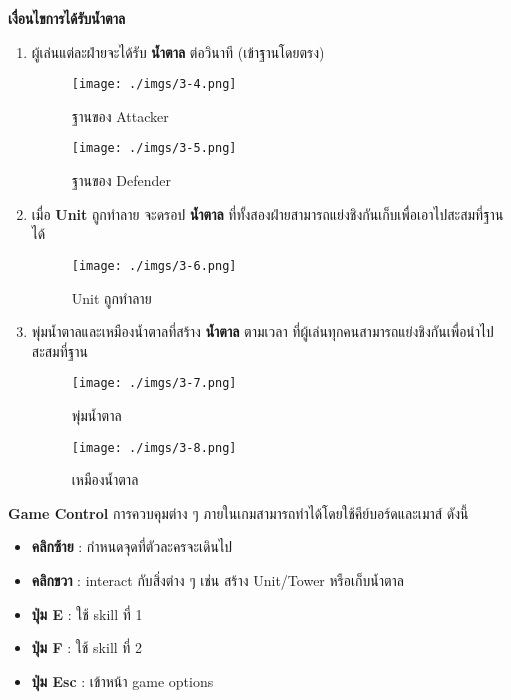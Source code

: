 \documentclass[12pt,oneside,openright,a4paper]{cpe-thai-project}
\begin{document}
\textbf{เงื่อนไขการได้รับน้ำตาล}

\begin{enumerate}
  \item ผู้เล่นแต่ละฝ่ายจะได้รับ \textbf{น้ำตาล} ต่อวินาที (เข้าฐานโดยตรง)
  \begin{figure}[H]\centering
    \begin{minipage}{.3\textwidth}
      \centering
      \texttt{[image: ./imgs/3-4.png]}
      \caption{ฐานของ Attacker}\label{fig:3-4}
    \end{minipage}
    \begin{minipage}{.3\textwidth}
      \centering
      \texttt{[image: ./imgs/3-5.png]}
      \caption{ฐานของ Defender}\label{fig:3-5}
    \end{minipage}
  \end{figure}

  \item เมื่อ \textbf{Unit} ถูกทำลาย จะดรอป \textbf{น้ำตาล} 
  ที่ทั้งสองฝ่ายสามารถแย่งชิงกันเก็บเพื่อเอาไปสะสมที่ฐานได้
  \begin{figure}[H]\centering
    \texttt{[image: ./imgs/3-6.png]}
    \caption{Unit ถูกทำลาย}\label{fig:3-6}
  \end{figure}

  \item พุ่มน้ำตาลและเหมืองน้ำตาลที่สร้าง \textbf{น้ำตาล} ตามเวลา 
  ที่ผู้เล่นทุกคนสามารถแย่งชิงกันเพื่อนำไปสะสมที่ฐาน
  \begin{figure}[H]\centering
    \begin{minipage}{.3\textwidth}
      \centering
      \texttt{[image: ./imgs/3-7.png]}
      \caption{พุ่มน้ำตาล}\label{fig:3-7}
    \end{minipage}
    \begin{minipage}{.3\textwidth}
      \centering
      \texttt{[image: ./imgs/3-8.png]}
      \caption{เหมืองน้ำตาล}\label{fig:3-8}
    \end{minipage}
  \end{figure}
\end{enumerate}

\textbf{Game Control}
การควบคุมต่าง ๆ ภายในเกมสามารถทำได้โดยใช้คีย์บอร์ดและเมาส์ ดังนี้
\begin{itemize}
  \item \textbf{คลิกซ้าย} : กำหนดจุดที่ตัวละครจะเดินไป
  \item \textbf{คลิกขวา} : interact กับสิ่งต่าง ๆ เช่น สร้าง Unit/Tower หรือเก็บน้ำตาล 
  \item \textbf{ปุ่ม E} : ใช้ skill ที่ 1
  \item \textbf{ปุ่ม F} : ใช้ skill ที่ 2
  \item \textbf{ปุ่ม Esc} : เข้าหน้า game options
  
\end{itemize}
\end{document}
